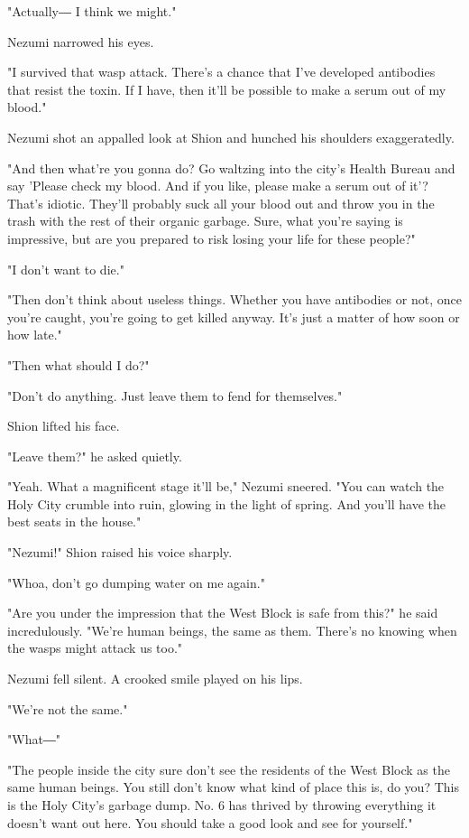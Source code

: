 "Actually― I think we might."

Nezumi narrowed his eyes.

"I survived that wasp attack. There's a chance that I've developed
antibodies that resist the toxin. If I have, then it'll be possible to
make a serum out of my blood."

Nezumi shot an appalled look at Shion and hunched his shoulders
exaggeratedly.

"And then what're you gonna do? Go waltzing into the city's Health
Bureau and say 'Please check my blood. And if you like, please make a
serum out of it'? That's idiotic. They'll probably suck all your blood
out and throw you in the trash with the rest of their organic garbage.
Sure, what you're saying is impressive, but are you prepared to risk
losing your life for these people?"

"I don't want to die."

"Then don't think about useless things. Whether you have antibodies or
not, once you're caught, you're going to get killed anyway. It's just a
matter of how soon or how late."

"Then what should I do?"

"Don't do anything. Just leave them to fend for themselves."

Shion lifted his face.

"Leave them?" he asked quietly.

"Yeah. What a magnificent stage it'll be," Nezumi sneered. "You can
watch the Holy City crumble into ruin, glowing in the light of spring.
And you'll have the best seats in the house."

"Nezumi!" Shion raised his voice sharply.

"Whoa, don't go dumping water on me again."

"Are you under the impression that the West Block is safe from this?" he
said incredulously. "We're human beings, the same as them. There's no
knowing when the wasps might attack us too."

Nezumi fell silent. A crooked smile played on his lips.

"We're not the same."

"What―"

"The people inside the city sure don't see the residents of the West
Block as the same human beings. You still don't know what kind of place
this is, do you? This is the Holy City's garbage dump. No. 6 has thrived
by throwing everything it doesn't want out here. You should take a good
look and see for yourself."


